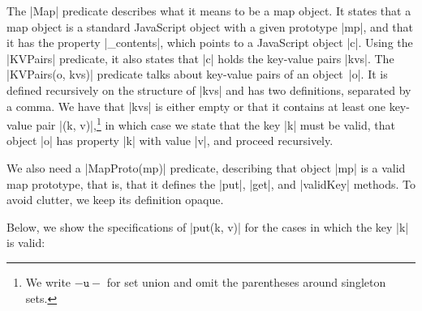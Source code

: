 \smallskip
The \jsinline|Map| predicate describes what it means to be a map object. 
It states that a map object is a standard JavaScript object with a given prototype \jsinline|mp|, and that it has the property \jsinline|_contents|, which points to a  JavaScript object \jsinline|c|.
Using the \jsinline|KVPairs| predicate, %
it also states that \jsinline|c| holds the key-value pairs \jsinline|kvs|. 
The \jsinline|KVPairs(o, kvs)| predicate talks about key-value pairs of an object~\jsinline|o|. 
It is defined recursively on the structure of \jsinline|kvs| and has two definitions, separated by a comma. 
We have that \jsinline|kvs| is either empty or that it contains at least one key-value pair \jsinline|(k, v)|,\footnote{We write $\mathtt{-u-}$ for set union and omit the parentheses around singleton sets.} 
in which case we state that the key \jsinline|k| must be valid, that object \jsinline|o| has  property \jsinline|k| with value \jsinline|v|, and proceed recursively.

We also need a \jsinline|MapProto(mp)| predicate, describing that object \jsinline|mp| is a valid map prototype, that is, that it defines the \jsinline|put|, \jsinline|get|, and \jsinline|validKey| methods. To avoid clutter, we keep its definition opaque.

Below, we show the specifications of \jsinline|put(k, v)| for the cases in which the key \jsinline|k| is valid:


